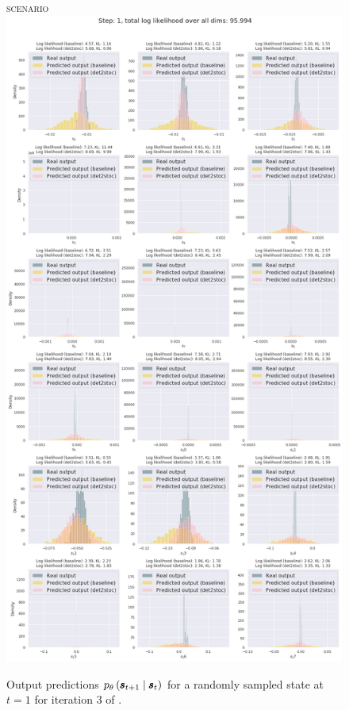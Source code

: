 \begin{figure}
    \centering
    \textsc{\MakeLowercase{\ws{} scenario}}\\
    \medskip
    \includegraphics[width=.8\textwidth,trim=0 0 0 70,clip]{img/windyslope/output/output_distribution_step1_delta_all}
    \caption{Output predictions $\ptheta \protect\given*{\vns}{\vs}$ for a randomly sampled state at $t=1$ for iteration 3 of \dettostoc{}.}
    \label{fig:output_distribution_step1_dettostoc}
\end{figure}%

